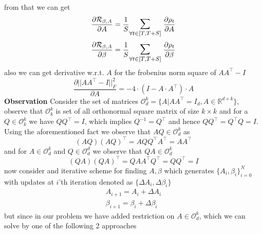 \newline from that we can get
\begin{equation}
    \frac{\partial \mathcal{R}_{\beta, A}}{\partial A} = \frac{1}{S} \mathlarger{\mathlarger{\sum}}_{\forall t\in [T,T+S]} \hspace{1mm} \frac{\partial \rho_t}{\partial A} 
\end{equation}
\begin{equation}
    \frac{\partial \mathcal{R}_{\beta, A}}{\partial \beta} = \frac{1}{S} \mathlarger{\mathlarger{\sum}}_{\forall t\in [T,T+S]} \hspace{1mm} \frac{\partial \rho_t}{\partial \beta} 
\end{equation}
\newline also we can get derivative w.r.t. $A$ for the frobenius norm square of $AA^\top-I$
\begin{equation} \label{eq:derivative_forb_norm_ofAAtmI}
    \frac{\partial ||AA^\top-I||^2_F}{\partial A} = -4\cdot (I-A\cdot A^\top )\cdot A
\end{equation}
\textbf{Observation}\newline 
Consider the set of matrices $\mathcal{O}_d^k = \{ A | AA^\top = I_d, A \in \mathbb{R}^{d\times k} \}$, observe that $\mathcal{O}_k^k$ is set of all orthonormal square matrix of size $k\times k$ and for a $Q\in \mathcal{O}_k^k$ we have $QQ^\top = I$, which implies $Q^{-1}= Q^\top$ and hence $QQ^\top = Q^\top Q = I$. Using the aforementioned fact we observe that $AQ\in \mathcal{O}_d^k$ as
\begin{equation} \label{observation:ortho-closure_odk}
    (AQ)(AQ)^\top = AQQ^\top A^\top = AA^\top 
\end{equation}
and for $A \in\mathcal{O}_d^k$ and $Q \in\mathcal{O}_d^d$ we observe that $QA\in \mathcal{O}_d^k$
\begin{equation} \label{observation:ortho-closure_odk_2}
    (QA)(QA)^\top = QAA^\top Q^\top = QQ^\top  = I
\end{equation}
now consider and iterative scheme for finding $A, \beta$ which generates $\{A_i, \beta_i\}_{i=0}^{N}$ with updates at $i$'th iteration denoted as $\{\Delta A_i, \Delta \beta_i\}$
\begin{equation}
\begin{aligned}
    A_{i+1} = A_i + \Delta A_i \\
    \beta_{i+1} = \beta_i + \Delta \beta_i
\end{aligned}
\end{equation}
but since in our problem we have added restriction on $A \in \mathcal{O}_d^k$, which we can solve by one of the following 2 approaches 
